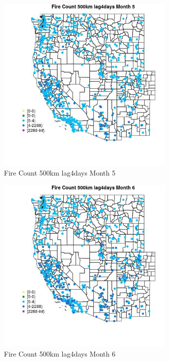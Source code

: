 \begin{figure} 
\centering  
\includegraphics[width=0.77\textwidth]{Code_Outputs/Report_ML_input_PM25_Step4_part_e_de_duplicated_aves_compiled_2019-05-21wNAs_MapObsMo5Fire_Count_500km_lag4days.jpg} 
\caption{\label{fig:Report_ML_input_PM25_Step4_part_e_de_duplicated_aves_compiled_2019-05-21wNAsMapObsMo5Fire_Count_500km_lag4days}Fire Count 500km lag4days Month 5} 
\end{figure} 
 

\begin{figure} 
\centering  
\includegraphics[width=0.77\textwidth]{Code_Outputs/Report_ML_input_PM25_Step4_part_e_de_duplicated_aves_compiled_2019-05-21wNAs_MapObsMo6Fire_Count_500km_lag4days.jpg} 
\caption{\label{fig:Report_ML_input_PM25_Step4_part_e_de_duplicated_aves_compiled_2019-05-21wNAsMapObsMo6Fire_Count_500km_lag4days}Fire Count 500km lag4days Month 6} 
\end{figure} 
 

